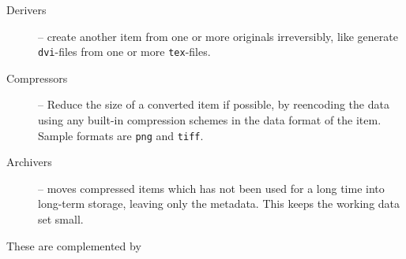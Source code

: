 \begin{description}
\item[Derivers] -- create another item from one or more
  originals irreversibly, like generate \texttt{dvi}-files
  from one or more \texttt{tex}-files.

  
\item[Compressors] -- Reduce the size of a converted item if
  possible, by reencoding the data using any built-in
  compression schemes in the data format of the item.
  Sample formats are \texttt{png} and \texttt{tiff}.
  
  
  
\item[Archivers] -- moves compressed items which has not
  been used for a long time into long-term storage, leaving
  only the metadata.  This keeps the working data set small.

  

\end{description}

These are complemented by

